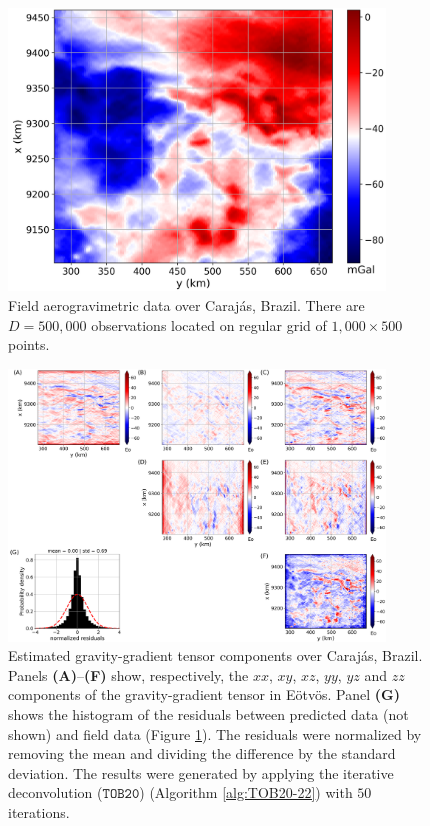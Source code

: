 \documentclass[utf8]{FrontiersinHarvard} %
\begin{document}
	\begin{figure}[htbp]
		\begin{center}
			\includegraphics[width=10cm]{Fig/carajas_data}
		\end{center}
		\caption{
			Field aerogravimetric data over Caraj{\'a}s, Brazil. 
			There are $D = 500, 000$ observations located on regular grid of $1,000 \times 500$ points.
		}
		\label{fig:carajas-data}
	\end{figure}
	
	\begin{figure}[htbp]
		\begin{center}
			\includegraphics[width=10cm]{Fig/carajas_grav_gradient}
		\end{center}
		\caption{
			Estimated gravity-gradient tensor components over Caraj{\'a}s, Brazil.
			Panels \textbf{(A)}--\textbf{(F)} show, respectively, the $xx$, $xy$, $xz$, $yy$, $yz$ and
			$zz$ components of the gravity-gradient tensor in E{\"o}tv{\"o}s.
			Panel \textbf{(G)} shows the histogram of the residuals between predicted data (not shown) and field data 
			(Figure \ref{fig:carajas-data}). 
			The residuals were normalized by removing the mean and dividing the difference
			by the standard deviation.
			The results were generated by applying the iterative deconvolution ($\mathtt{TOB20}$)
			(Algorithm \ref{alg:TOB20-22})
			with $50$ iterations.
		}
		\label{fig:carajas-grav-gradient}
	\end{figure}
	
\end{document}
